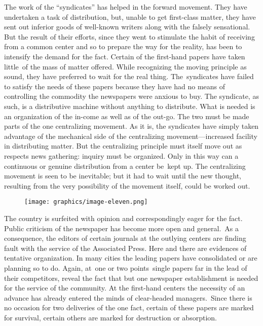 \documentclass[openany,nobib]{tufte-book}
\begin{document}
The work of the ``syndicates'' has helped in the forward movement. They
have undertaken a task of distribution, but, unable to get first-class
matter, they have sent out inferior goods of well-known writers along
with the falsely sensational. But the result of their efforts, since
they went to stimulate the habit of receiving from a common center and
so to prepare the way for the reality, has been to intensify the demand
for the fact. Certain of the first-hand papers have taken little~of the
mass of matter offered. While recognizing the moving principle as sound,
they have preferred to wait for the real thing. The~syndicates have
failed to satisfy the needs of these papers because they have had no
means of controlling the commodity the newspapers were anxious to buy.
The syndicate, as such, is a distributive machine without anything to
distribute. What is needed is an organization of the in-come as well as
of the out-go. The two must be made parts of the one centralizing
movement. As it is, the syndicates have simply taken advantage of the
mechanical side of the centralizing movement---increased facility in
distributing matter. But the centralizing principle must itself move out
as respects news gathering: inquiry must be organized. Only in this way
can a continuous or genuine distribution from a center be~kept up. The
centralizing movement is seen to be inevitable; but it had to wait until
the new thought, resulting from the very possibility of the movement
itself, could be worked out.

\begin{figure}
   \texttt{[image: graphics/image-eleven.png]}
   \label{fig:fig11}
\end{figure}

The country is surfeited with opinion and correspondingly eager for the
fact. Public criticism of the newspaper has become more open and
general.~As a consequence, the editors of certain journals at the
outlying centers are finding fault with the service of the Associated
Press. Here and there are evidences of tentative organization. In many
cities the leading papers have consolidated or are planning so to do.
Again, at~one or two points~single papers far in the lead of their
competitors, reveal the fact that but one newspaper establishment is
needed for the service of the community. At the first-hand centers the
necessity of an advance has already entered the minds of clear-headed
managers.~Since there is no occasion for two deliveries of the one fact,
certain of these papers are marked for survival, certain others are
marked for destruction or absorption.~
\end{document}
